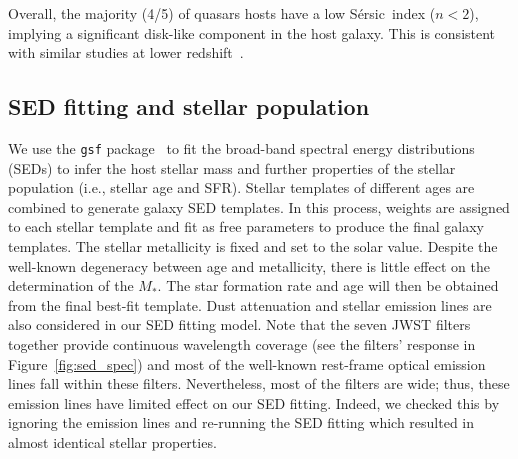 \documentclass[twocolumn,]{aastex631}
\newcommand{\sersic}{S\'ersic}
\newcommand{\smass}{{$M_*$}}
\begin{document}
Overall, the majority (4/5) of quasars hosts have a low \sersic\ index ($n<2$), implying a significant disk-like component in the host galaxy. This is consistent with similar studies at lower redshift~\citep[e.g.,][]{Schawinski2012,Ding2020,Li2021,Zhuang2022}.


\subsection{SED fitting and stellar population}


We use the \texttt{gsf} package~\citep{Morishita2019} to fit the broad-band spectral energy distributions (SEDs) to infer the host stellar mass and further properties of the stellar population (i.e., stellar age and SFR). 
Stellar templates of different ages are combined to generate galaxy SED templates. In this process, weights are assigned to each stellar template and fit as free parameters to produce the final galaxy templates.
The stellar metallicity is fixed and set to the solar value. Despite the well-known degeneracy between age and metallicity, there is little effect on the determination of the \smass. The star formation rate and age will then be obtained from the final best-fit template. Dust attenuation and stellar emission lines are also considered in our SED fitting model. Note that the seven JWST filters together provide continuous wavelength coverage (see the filters' response in Figure~\ref{fig:sed_spec}) and most of the well-known rest-frame optical emission lines fall within these filters. Nevertheless, most of the filters are wide; thus, these emission lines have limited effect on our SED fitting. Indeed, we checked this by ignoring the emission lines and re-running the SED fitting which resulted in almost identical stellar properties.
\end{document}
